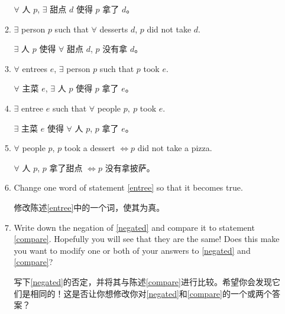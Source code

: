 \begin{enumerate}
\begin{enumerate}
    $\forall$ 人 $p$, $\exists$ 甜点 $d$ 使得 $p$ 拿了 $d$。
    \item \label{compare} \wbitemsep $\exists$ person $p$ such that $\forall$ desserts
    $d$, $p$ did not take $d$.
    
    $\exists$ 人 $p$ 使得 $\forall$ 甜点 $d$, $p$ 没有拿 $d$。
    \item \wbitemsep $\forall$ entrees $e$, $\exists$ person $p$ such that $ p$ took
    $e$.
    
    $\forall$ 主菜 $e$, $\exists$ 人 $p$ 使得 $p$ 拿了 $e$。
    \item \label{entree} \wbitemsep $\exists$ entree $e$ such that  $\forall$ people
    $p,\ p$ took $e$.
    
    $\exists$ 主菜 $e$ 使得 $\forall$ 人 $p$, $p$ 拿了 $e$。
    \item \wbitemsep $\forall$ people $p$, $p$ took a dessert $\iff p$ did not take
    a pizza.
    
    $\forall$ 人 $p$, $p$ 拿了甜点 $\iff p$ 没有拿披萨。
    \item \wbitemsep Change one word of statement \ref{entree} so that it becomes true.
    
    修改陈述\ref{entree}中的一个词，使其为真。
    \item \wbitemsep Write down the negation of \ref{negated} and compare it to statement
    \ref{compare}.
    Hopefully you will see that they are the same! Does
    this make you want to modify one or both of your answers to \ref{negated}
    and \ref{compare}?
    
    写下\ref{negated}的否定，并将其与陈述\ref{compare}进行比较。希望你会发现它们是相同的！这是否让你想修改你对\ref{negated}和\ref{compare}的一个或两个答案？
    \end{enumerate}
    
    \end{enumerate}